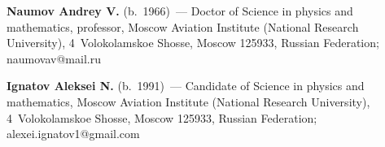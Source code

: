 \vspace*{6pt}

\noindent
\textbf{Naumov Andrey V.} (b.\ 1966)~--- Doctor of Science in physics and mathematics, professor, 
Moscow Aviation Institute (National Research University), 4~Volokolamskoe Shosse, Moscow 
125933, Russian Federation; \mbox{naumovav@mail.ru}

\vspace*{6pt}

\noindent
\textbf{Ignatov Aleksei N.} (b.\ 1991)~--- Candidate of Science in physics and mathematics, Moscow 
Aviation Institute (National Research University), 4~Volokolamskoe Shosse, Moscow 125933, Russian 
Federation; \mbox{alexei.ignatov1@gmail.com}

\label{end\stat}

\renewcommand{\bibname}{\protect\rm Литература}